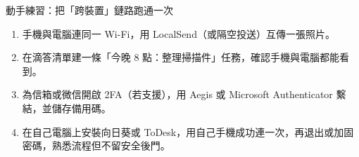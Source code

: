 \begin{tcbpractice}{動手練習：把「跨裝置」鏈路跑通一次}
\begin{enumerate}
  \item 手機與電腦連同一 Wi-Fi，用 LocalSend（或隔空投送）互傳一張照片。
  \item 在滴答清單建一條「今晚 8 點：整理掃描件」任務，確認手機與電腦都能看到。
  \item 為信箱或微信開啟 2FA（若支援），用 Aegis 或 Microsoft Authenticator 繫結，並儲存備用碼。
  \item 在自己電腦上安裝向日葵或 ToDesk，用自己手機成功連一次，再退出或加固密碼，熟悉流程但不留安全後門。
\end{enumerate}

\end{tcbpractice}
